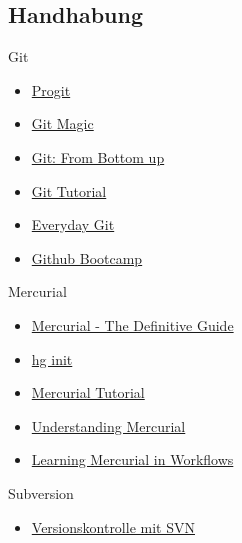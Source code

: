 \documentclass[presentation]{beamer}
\begin{document}
\subsection{Handhabung}
\begin{frame}{Git}
  \begin{itemize}[<+->]
  \item \href{http://progit.org/book/}{Progit}
  \item \href{http://www-cs-students.stanford.edu/~blynn/gitmagic/}{Git Magic}
  \item \href{http://www.newartisans.com/2008/04/git-from-the-bottom-up.html}{Git: From Bottom up}
  \item \href{http://www.kernel.org/pub/software/scm/git/docs/gittutorial.html}{Git Tutorial}
  \item \href{http://www.kernel.org/pub/software/scm/git/docs/everyday.html}{Everyday Git}
  \item \href{http://help.github.com/}{Github Bootcamp}
  \end{itemize}
\end{frame}
\begin{frame}{Mercurial}
  \begin{itemize}[<+->]
  \item \href{http://hgbook.red-bean.com/}{Mercurial - The Definitive Guide}
  \item \href{http://hginit.com/}{hg init}
  \item \href{http://mercurial.selenic.com/wiki/Tutorial}{Mercurial Tutorial}
  \item \href{http://mercurial.selenic.com/wiki/UnderstandingMercurial}{Understanding Mercurial}
  \item \href{http://mercurial.selenic.com/guide/}{Learning Mercurial in Workflows}
  \end{itemize}
\end{frame}
\begin{frame}{Subversion}
  \begin{itemize}
  \item \href{http://svnbook.red-bean.com/}{Versionskontrolle mit SVN}
  \end{itemize}
\end{frame}
\end{document}
